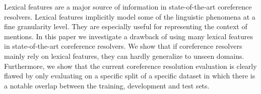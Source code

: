 Lexical features are a major source of information in state-of-the-art coreference resolvers. Lexical features implicitly model some of the linguistic phenomena at a fine granularity level. They are especially useful for representing the context of mentions. In this paper we investigate a drawback of using many lexical features in state-of-the-art coreference resolvers. We show that if coreference resolvers mainly rely on lexical features, they can hardly generalize to unseen domains. Furthermore, we show that the current coreference resolution evaluation is clearly flawed by only evaluating on a specific split of a specific dataset in which there is a notable overlap between the training, development and test sets.
